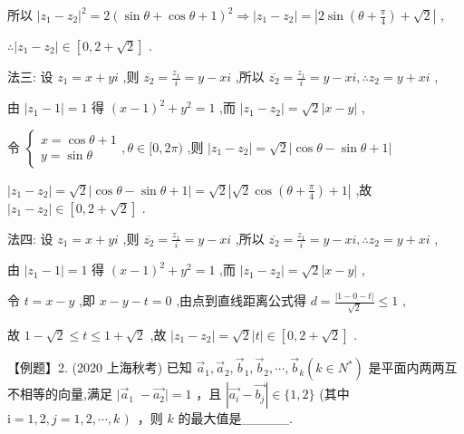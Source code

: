 \documentclass[10pt]{article}
\begin{document}
所以 \({\left| {z}_{1} - {z}_{2}\right| }^{2} = 2{\left( \sin \theta  + \cos \theta  + 1\right) }^{2} \Rightarrow  \left| {{z}_{1} - {z}_{2}}\right|  = \left| {2\sin \left( {\theta  + \frac{\pi }{4}}\right)  + \sqrt{2}}\right|\) ,

\(\therefore \left| {{z}_{1} - {z}_{2}}\right|  \in  \left\lbrack  {0,2 + \sqrt{2}}\right\rbrack\) .

法三: 设 \({z}_{1} = x + {yi}\) ,则 \(\overline{{z}_{2}} = \frac{{z}_{1}}{i} = y - {xi}\) ,所以 \(\overline{{z}_{2}} = \frac{{z}_{1}}{i} = y - {xi},\therefore {z}_{2} = y + {xi}\) ,

由 \(\left| {{z}_{1} - 1}\right|  = 1\) 得 \({\left( x - 1\right) }^{2} + {y}^{2} = 1\) ,而 \(\left| {{z}_{1} - {z}_{2}}\right|  = \sqrt{2}\left| {x - y}\right|\) ,

令 \(\left\{  {\begin{array}{l} x = \cos \theta  + 1 \\  y = \sin \theta  \end{array},\theta  \in  \lbrack 0,{2\pi })}\right.\) ,则 \(\left| {{z}_{1} - {z}_{2}}\right|  = \sqrt{2}\left| {\cos \theta  - \sin \theta  + 1}\right|\)

\(\left| {{z}_{1} - {z}_{2}}\right|  = \sqrt{2}\left| {\cos \theta  - \sin \theta  + 1}\right|  = \sqrt{2}\left| {\sqrt{2}\cos \left( {\theta  + \frac{\pi }{4}}\right)  + 1}\right|\) ,故 \(\left| {{z}_{1} - {z}_{2}}\right|  \in  \left\lbrack  {0,2 + \sqrt{2}}\right\rbrack\) .

法四: 设 \({z}_{1} = x + {yi}\) ,则 \(\overline{{z}_{2}} = \frac{{z}_{1}}{i} = y - {xi}\) ,所以 \(\overline{{z}_{2}} = \frac{{z}_{1}}{i} = y - {xi},\therefore {z}_{2} = y + {xi}\) ,

由 \(\left| {{z}_{1} - 1}\right|  = 1\) 得 \({\left( x - 1\right) }^{2} + {y}^{2} = 1\) ,而 \(\left| {{z}_{1} - {z}_{2}}\right|  = \sqrt{2}\left| {x - y}\right|\) ,

令 \(t = x - y\) ,即 \(x - y - t = 0\) ,由点到直线距离公式得 \(d = \frac{\left| 1 - 0 - t\right| }{\sqrt{2}} \leq  1\) ,

故 \(1 - \sqrt{2} \leq  t \leq  1 + \sqrt{2}\) ,故 \(\left| {{z}_{1} - {z}_{2}}\right|  = \sqrt{2}\left| t\right|  \in  \left\lbrack  {0,2 + \sqrt{2}}\right\rbrack\) .

【例题】2. (2020 上海秋考) 已知 \({\overrightarrow{a}}_{1},{\overrightarrow{a}}_{2},{\overrightarrow{b}}_{1},{\overrightarrow{b}}_{2},\cdots ,{\overrightarrow{b}}_{k}\left( {k \in  {N}^{ * }}\right)\) 是平面内两两互不相等的向量,满足 \(\mid  {\overrightarrow{a}}_{1} \; - \overrightarrow{{a}_{2}} \mid   = 1\) ，且 \(\left| {\overrightarrow{{a}_{i}} - \overrightarrow{{b}_{j}}}\right|  \in  \{ 1,2\}\) (其中 \(\mathrm{i} = 1,2,j = 1,2,\cdots ,k\text{ ) }\) ，则 \(k\) 的最大值是\_\_\_\_\_.
\end{document}
